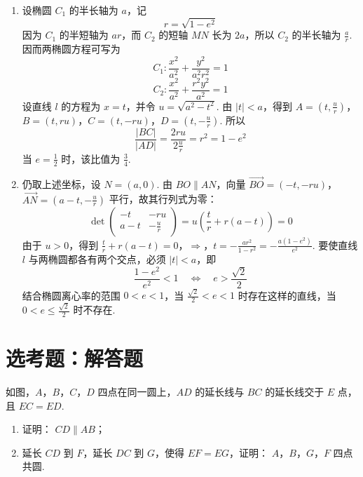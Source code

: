 \begin{solution}
\begin{enumerate}
\item 设椭圆 \(C_{1}\) 的半长轴为 \(a\)，记
\[
r=\sqrt{1-e^{2}}
\]
因为 \(C_{1}\) 的半短轴为 \(ar\)，而 \(C_{2}\) 的短轴 \(MN\) 长为 \(2a\)，所以 \(C_{2}\) 的半长轴为 \(\frac{a}{r}\). 因而两椭圆方程可写为
\[
C_{1}:\frac{x^{2}}{a^{2}}+\frac{y^{2}}{a^{2}r^{2}}=1
\]
\[
C_{2}:\frac{x^{2}}{a^{2}}+\frac{r^{2}y^{2}}{a^{2}}=1
\]
设直线 \(l\) 的方程为 \(x=t\)，并令 \(u=\sqrt{a^{2}-t^{2}}\). 由 \(\lvert t\rvert<a\)，得到 \(A=\left(t,\frac{u}{r}\right)\)，\(B=(t,ru)\)，\(C=(t,-ru)\)，\(D=\left(t,-\frac{u}{r}\right)\).
所以
\[
\frac{\lvert BC\rvert}{\lvert AD\rvert}
=\frac{2ru}{2\frac{u}{r}}=r^{2}=1-e^{2}
\]
当 \(e=\frac12\) 时，该比值为 \(\frac34\).
\item 仍取上述坐标，设 \(N=(a,0)\). 由 \(BO\parallel AN\)，向量 \(\overrightarrow{BO}=(-t,-ru)\)，\(\overrightarrow{AN}=\left(a-t,-\frac{u}{r}\right)\) 平行，故其行列式为零：
\[
\det\begin{pmatrix}-t&-ru\\a-t&-\frac{u}{r}\end{pmatrix}
=u\left(\frac{t}{r}+r(a-t)\right)=0
\]
由于 \(u>0\)，得到
\(\frac{t}{r}+r(a-t)=0\)，\(\Longrightarrow\)，\(t=-\frac{ar^{2}}{1-r^{2}}=-\frac{a(1-e^{2})}{e^{2}}\).
要使直线 \(l\) 与两椭圆都各有两个交点，必须 \(\lvert t\rvert<a\)，即
\[
\frac{1-e^{2}}{e^{2}}<1
\quad\Longleftrightarrow\quad
e>\frac{\sqrt2}{2}
\]
结合椭圆离心率的范围 \(0<e<1\)，当 \(\frac{\sqrt2}{2}<e<1\) 时存在这样的直线，当 \(0<e\leqslant\frac{\sqrt2}{2}\) 时不存在.
\end{enumerate}
\end{solution}

\section{选考题：解答题}

\begin{problem}
如图，\(A\)，\(B\)，\(C\)，\(D\) 四点在同一圆上，\(AD\) 的延长线与 \(BC\) 的延长线交于 \(E\) 点，且 \(EC = ED\).
\begin{enumerate}
\item 证明： \(CD \parallel AB\)；
\item 延长 \(CD\) 到 \(F\)，延长 \(DC\) 到 \(G\)，使得 \(EF = EG\)，证明： \(A\)，\(B\)，\(G\)，\(F\) 四点共圆.
\end{enumerate}

\end{problem}

